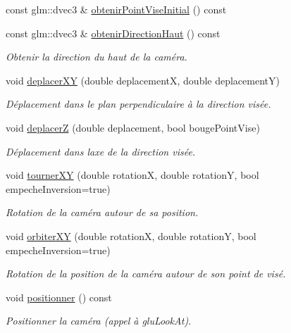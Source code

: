 \begin{DoxyCompactItemize}
const glm\+::dvec3 \& \hyperlink{classvue_1_1_camera_af0a8e31fef378798c296cba418e88b50}{obtenir\+Point\+Vise\+Initial} () const 
\item 
const glm\+::dvec3 \& \hyperlink{classvue_1_1_camera_a51913d2a228cb4b90bb5eb72a4a15970}{obtenir\+Direction\+Haut} () const 
\begin{DoxyCompactList}\small\item\em Obtenir la direction du haut de la caméra. \end{DoxyCompactList}\item 
void \hyperlink{classvue_1_1_camera_aa08801e436ddf90400e632e402183618}{deplacer\+X\+Y} (double deplacement\+X, double deplacement\+Y)
\begin{DoxyCompactList}\small\item\em Déplacement dans le plan perpendiculaire à la direction visée. \end{DoxyCompactList}\item 
void \hyperlink{classvue_1_1_camera_a7e8dfbbf743a74bb0387e140fee09474}{deplacer\+Z} (double deplacement, bool bouge\+Point\+Vise)
\begin{DoxyCompactList}\small\item\em Déplacement dans l\textquotesingle{}axe de la direction visée. \end{DoxyCompactList}\item 
void \hyperlink{classvue_1_1_camera_a07795ebc629c68f8694b9ae08a53457f}{tourner\+X\+Y} (double rotation\+X, double rotation\+Y, bool empeche\+Inversion=true)
\begin{DoxyCompactList}\small\item\em Rotation de la caméra autour de sa position. \end{DoxyCompactList}\item 
void \hyperlink{classvue_1_1_camera_a5e88216d5d5b31e0e65be9674e5904ef}{orbiter\+X\+Y} (double rotation\+X, double rotation\+Y, bool empeche\+Inversion=true)
\begin{DoxyCompactList}\small\item\em Rotation de la position de la caméra autour de son point de visé. \end{DoxyCompactList}\item 
void \hyperlink{classvue_1_1_camera_a201db90bcebf204990f1dbb6db03b563}{positionner} () const 
\begin{DoxyCompactList}\small\item\em Positionner la caméra (appel à glu\+Look\+At). \end{DoxyCompactList}\end{DoxyCompactItemize}


